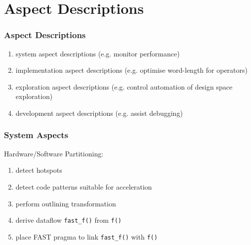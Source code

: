 \section{Aspect Descriptions}
\begin{frame}
  \frametitle{Aspect Descriptions}
\begin{enumerate}
  \item  system aspect descriptions (e.g. monitor performance)
  \item implementation aspect descriptions (e.g. optimise word-length for operators)
  \item exploration aspect descriptions (e.g. control automation of design space exploration)
  \item development aspect descriptions (e.g. assist debugging)
\end{enumerate}

\end{frame}


\begin{frame}
  \frametitle{System Aspects}
Hardware/Software Partitioning:
\begin{enumerate}
  \item detect hotspots
  \item detect code patterns suitable for acceleration
  \item perform outlining transformation
  \item derive dataflow \texttt{fast\_f()} from \texttt{f()}
  \item place FAST pragma to link \texttt{fast\_f()} with \texttt{f()}
\end{enumerate}
\end{frame}